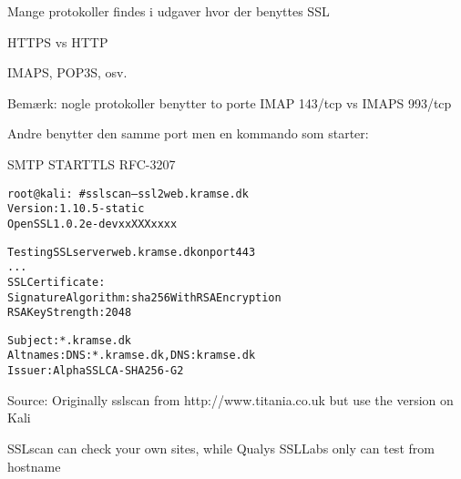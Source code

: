 \documentclass[Screen16to9,17pt]{foils}
\begin{document}

\begin{list1}
\item Mange protokoller findes i udgaver hvor der benyttes SSL
\item HTTPS vs HTTP
\item IMAPS, POP3S, osv.
\item Bemærk: nogle protokoller benytter to porte IMAP 143/tcp vs IMAPS 993/tcp
\item Andre benytter den samme port men en kommando som starter:
\item SMTP STARTTLS RFC-3207
\end{list1}




\begin{alltt}\small
root@kali:~# sslscan --ssl2 web.kramse.dk
Version: 1.10.5-static
OpenSSL 1.0.2e-dev xx XXX xxxx

Testing SSL server web.kramse.dk on port 443
...
  SSL Certificate:
Signature Algorithm: sha256WithRSAEncryption
RSA Key Strength:    2048

Subject:  *.kramse.dk
Altnames: DNS:*.kramse.dk, DNS:kramse.dk
Issuer:   AlphaSSL CA - SHA256 - G2
\end{alltt}

Source:
Originally sslscan from http://www.titania.co.uk
 but use the version on Kali

SSLscan can check your own sites, while Qualys SSLLabs only can test from hostname






\slidenext{}
\end{document}
